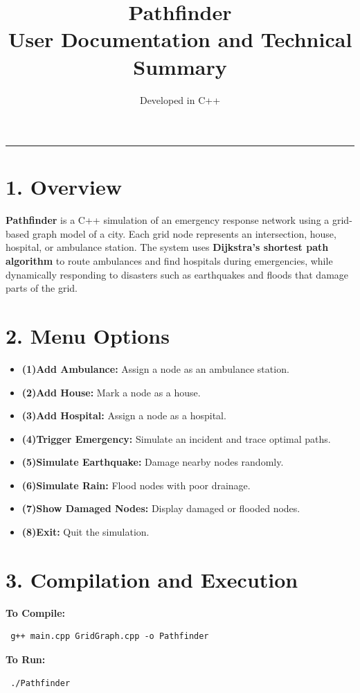 \documentclass[a4paper,12pt]{article}
\title{\vspace{-2cm}\textbf{Pathfinder}\\\large User Documentation and Technical Summary}
\author{Developed in C++}
\date{}
\begin{document}
\maketitle
\vspace{-0.4cm}
\hrule
\vspace{0.4cm}

\section*{1. Overview}
\textbf{Pathfinder} is a C++ simulation of an emergency response network using a grid-based graph model of a city.  
Each grid node represents an intersection, house, hospital, or ambulance station. The system uses \textbf{Dijkstra’s shortest path algorithm} to route ambulances and find hospitals during emergencies, while dynamically responding to disasters such as earthquakes and floods that damage parts of the grid.

\section*{2. Menu Options}
\begin{itemize}
    \item \textbf{ (1)Add Ambulance:} Assign a node as an ambulance station.
    \item \textbf{ (2)Add House:} Mark a node as a house.
    \item \textbf{ (3)Add Hospital:} Assign a node as a hospital.
    \item \textbf{ (4)Trigger Emergency:} Simulate an incident and trace optimal paths.
    \item \textbf{ (5)Simulate Earthquake:} Damage nearby nodes randomly.
    \item \textbf{ (6)Simulate Rain:} Flood nodes with poor drainage.
    \item \textbf{ (7)Show Damaged Nodes:} Display damaged or flooded nodes.
    \item \textbf{ (8)Exit:} Quit the simulation.
\end{itemize}

\section*{3. Compilation and Execution}
\textbf{To Compile:} \begin{verbatim} g++ main.cpp GridGraph.cpp -o Pathfinder \end{verbatim}
\textbf{To Run:} \begin{verbatim} ./Pathfinder \end{verbatim}
\end{document}
